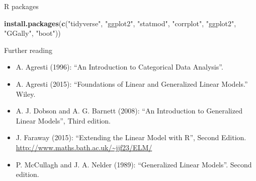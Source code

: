 \documentclass[
  ignorenonframetext,
]{beamer}
\newenvironment{Shaded}{\begin{snugshade}}{\end{snugshade}}
\newcommand{\FunctionTok}[1]{\textcolor[rgb]{0.13,0.29,0.53}{\textbf{#1}}}
\newcommand{\NormalTok}[1]{#1}
\newcommand{\StringTok}[1]{\textcolor[rgb]{0.31,0.60,0.02}{#1}}
\providecommand{\tightlist}{%
  \setlength{\itemsep}{0pt}\setlength{\parskip}{0pt}}
\begin{document}
\begin{frame}[fragile]{R packages}
\protect\hypertarget{r-packages}{}
\begin{Shaded}
\begin{Highlighting}[]
\FunctionTok{install.packages}\NormalTok{(}\FunctionTok{c}\NormalTok{(}\StringTok{"tidyverse"}\NormalTok{, }\StringTok{"ggplot2"}\NormalTok{, }\StringTok{"statmod"}\NormalTok{, }\StringTok{"corrplot"}\NormalTok{, }\StringTok{"ggplot2"}\NormalTok{, }\StringTok{"GGally"}\NormalTok{,}
    \StringTok{"boot"}\NormalTok{))}
\end{Highlighting}
\end{Shaded}
\end{frame}

\begin{frame}{Further reading}
\protect\hypertarget{further-reading}{}
\begin{itemize}
\tightlist
\item
  A. Agresti (1996): ``An Introduction to Categorical Data Analysis''.
\item
  A. Agresti (2015): ``Foundations of Linear and Generalized Linear
  Models.'' Wiley.
\item
  A. J. Dobson and A. G. Barnett (2008): ``An Introduction to
  Generalized Linear Models'', Third edition.
\item
  J. Faraway (2015): ``Extending the Linear Model with R'', Second
  Edition. \url{http://www.maths.bath.ac.uk/~jjf23/ELM/}
\item
  P. McCullagh and J. A. Nelder (1989): ``Generalized Linear Models''.
  Second edition.
\end{itemize}
\end{frame}
\end{document}
